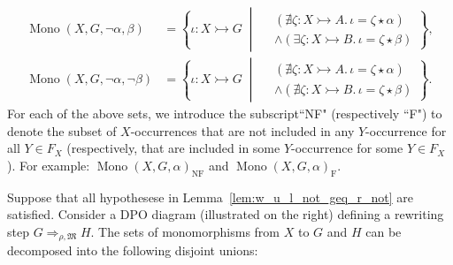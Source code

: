 \begin{notation}
\begin{align*}
        \\
        \operatorname{Mono}(X,G,\lnot \alpha, \beta) &= \left\{ 
            \iota \colon X \rightarrowtail G \;\middle|\; 
                \begin{aligned}  
                    &(\nexists \zeta \colon X \rightarrowtail A.\, \iota = \zeta \star \alpha) \\ 
                    &\land (\exists \zeta \colon X \rightarrowtail B.\, \iota = \zeta \star \beta)
                \end{aligned}
        \right\},
        \\
        \operatorname{Mono}(X,G,\lnot \alpha, \lnot \beta) &= \left\{ 
            \iota \colon X \rightarrowtail G \;\middle|\; 
                \begin{aligned}
                    &(\nexists \zeta \colon X \rightarrowtail A.\, \iota = \zeta \star \alpha) \\
                    &\land (\nexists \zeta \colon X \rightarrowtail B.\, \iota = \zeta \star \beta)
                \end{aligned}
        \right\}.
    \end{align*}
    For each of the above sets, we introduce the subscript``NF" (respectively ``F") to denote the subset of \( X \)-occurrences that are not included in any \( Y \)-occurrence for all \( Y \in F_X \) (respectively, that are included in some \( Y \)-occurrence for some \( Y \in F_X \)). For example: \( \operatorname{Mono}(X, G, \alpha)_{\text{NF}} \) and \( \operatorname{Mono}(X, G, \alpha)_{\text{F}} \).
\end{notation}
\noindent
\begin{minipage}{0.7\textwidth}\setlength{\parindent}{1em}
    Suppose that all hypothesese in Lemma~\ref{lem:w_u_l_not_geq_r_not} are satisfied. Consider a DPO diagram (illustrated on the right) defining a rewriting step \( G \Rightarrow_{\rho,\mathfrak{M}} H \). 
    The sets of monomorphisms from \( X \) to \( G \) and \( H \) can be decomposed into the following disjoint unions:
\end{minipage}%
\begin{minipage}{0.29\textwidth}
    \hfill
\end{minipage}

